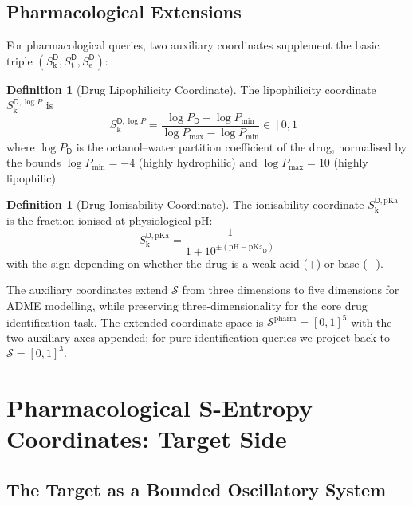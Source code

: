 \documentclass[11pt,twocolumn,a4paper]{article}
\theoremstyle{definition}
\newtheorem{definition}[theorem]{Definition}
\theoremstyle{remark}
\newcommand{\Sk}{S_{\mathrm{k}}}
\newcommand{\St}{S_{\mathrm{t}}}
\newcommand{\Se}{S_{\mathrm{e}}}
\newcommand{\Sspace}{\mathcal{S}}
\newcommand{\Drug}{\mathsf{D}}
\begin{document}
\subsection{Pharmacological Extensions}

For pharmacological queries, two auxiliary coordinates supplement the basic triple $(\Sk^\Drug, \St^\Drug, \Se^\Drug)$:

\begin{definition}[Drug Lipophilicity Coordinate]
\label{def:lipo}
The lipophilicity coordinate $\Sk^{\Drug,\log P}$ is
\begin{equation}
\Sk^{\Drug,\log P} = \frac{\log P_{\Drug} - \log P_{\min}}{\log P_{\max} - \log P_{\min}} \in [0, 1]
\end{equation}
where $\log P_\Drug$ is the octanol--water partition coefficient of the drug, normalised by the bounds $\log P_{\min} = -4$ (highly hydrophilic) and $\log P_{\max} = 10$ (highly lipophilic) \citep{hansch1995}.
\end{definition}

\begin{definition}[Drug Ionisability Coordinate]
\label{def:ion}
The ionisability coordinate $\Sk^{\Drug,\mathrm{pKa}}$ is the fraction ionised at physiological pH:
\begin{equation}
\Sk^{\Drug,\mathrm{pKa}} = \frac{1}{1 + 10^{\pm(\mathrm{pH} - \mathrm{pKa}_\Drug)}}
\end{equation}
with the sign depending on whether the drug is a weak acid ($+$) or base ($-$).
\end{definition}

The auxiliary coordinates extend $\Sspace$ from three dimensions to five dimensions for ADME modelling, while preserving three-dimensionality for the core drug identification task. The extended coordinate space is $\Sspace^{\mathrm{pharm}} = [0,1]^5$ with the two auxiliary axes appended; for pure identification queries we project back to $\Sspace = [0,1]^3$.

\section{Pharmacological S-Entropy Coordinates: Target Side}
\label{sec:target_coords}

\subsection{The Target as a Bounded Oscillatory System}
\end{document}
